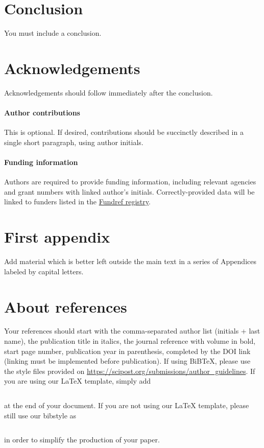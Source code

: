 \documentclass{SciPost}
\begin{document}
\section{Conclusion}
You must include a conclusion.

\section*{Acknowledgements}
Acknowledgements should follow immediately after the conclusion.

\paragraph{Author contributions}
This is optional. If desired, contributions should be succinctly described in a single short paragraph, using author initials.

\paragraph{Funding information}
Authors are required to provide funding information, including relevant agencies and grant numbers with linked author's initials. Correctly-provided data will be linked to funders listed in the \href{https://www.crossref.org/services/funder-registry/}{\sf Fundref registry}.


\begin{appendix}

\section{First appendix}
Add material which is better left outside the main text in a series of Appendices labeled by capital letters.

\section{About references}
Your references should start with the comma-separated author list (initials + last name), the publication title in italics, the journal reference with volume in bold, start page number, publication year in parenthesis, completed by the DOI link (linking must be implemented before publication). If using BiBTeX, please use the style files provided  on \url{https://scipost.org/submissions/author_guidelines}. If you are using our LaTeX template, simply add
\begin{verbatim}

\end{verbatim}
at the end of your document. If you are not using our LaTeX template, please still use our bibstyle as
\begin{verbatim}

\end{verbatim}
in order to simplify the production of your paper.
\end{appendix}
\end{document}
